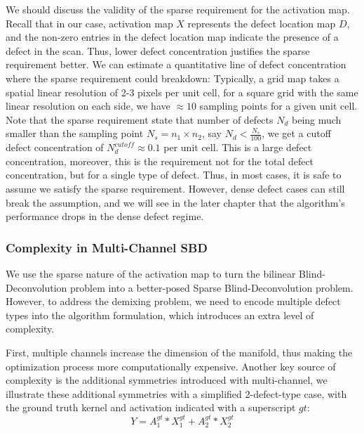We should discuss the validity of the sparse requirement for the activation map. Recall that in our case, activation map $X$ represents the defect location map $D$, and the non-zero entries in the defect location map indicate the presence of a defect in the scan. Thus, lower defect concentration justifies the sparse requirement better. We can estimate a quantitative line of defect concentration where the sparse requirement could breakdown: Typically, a grid map takes a spatial linear resolution of 2-3 pixels per unit cell, for a square grid with the same linear resolution on each side, we have $\approx 10$ sampling points for a given unit cell. Note that the sparse requirement state that number of defects $N_d$ being much smaller than the sampling point $N_s = n_1 \times n_2$, say $N_d < \frac{N_s}{100}$, we get a cutoff defect concentration of $N_d^{cutoff} \approx 0.1$ per unit cell. This is a large defect concentration, moreover, this is the requirement not for the total defect concentration, but for a single type of defect. Thus, in most cases, it is safe to assume we satisfy the sparse requirement. However, dense defect cases can still break the assumption, and we will see in the later chapter that the algorithm's performance drops in the dense defect regime. 

\subsubsection{Complexity in Multi-Channel SBD}
We use the sparse nature of the activation map to turn the bilinear Blind-Deconvolution problem into a better-posed Sparse Blind-Deconvolution problem. However, to address the demixing problem, we need to encode multiple defect types into the algorithm formulation, which introduces an extra level of complexity. 

First, multiple channels increase the dimension of the manifold, thus making the optimization process more computationally expensive. Another key source of complexity is the additional symmetries introduced with multi-channel, we illustrate these additional symmetries with a simplified 2-defect-type case, with the ground truth kernel and activation indicated with a superscript $gt$: 
\begin{equation*}
	Y = A_1^{gt}*X_1^{gt} + A_2^{gt}*X_2^{gt}
\end{equation*} 

